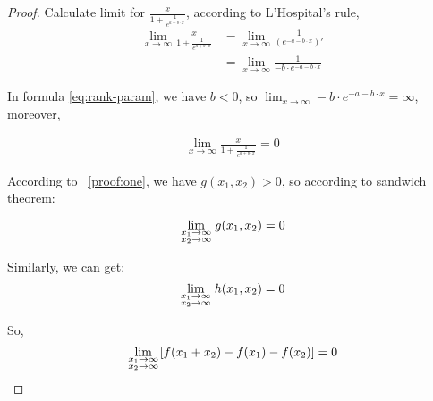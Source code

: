 \begin{proof}
Calculate limit for $\frac{x}{1+\frac{1}{e^{a+b\cdot x}}}$, according to L'Hospital's rule,
\[
\begin{aligned}
\lim_{x \to \infty}\frac{x}{1+\frac{1}{e^{a+b\cdot x}}}&=\lim_{x \to \infty}\frac{1}{(e^{-a-b\cdot x})'}\\
&=\lim_{x \to \infty}\frac{1}{-b\cdot e^{-a-b\cdot x}}
\end{aligned}
\]

In formula \ref{eq:rank-param}, we have $b<0$, so $\lim_{x \to \infty}-b\cdot e^{-a-b\cdot x}=\infty$, moreover,

\[
\begin{aligned}
\lim_{x \to \infty}\frac{x}{1+\frac{1}{e^{a+b\cdot x}}}=0
\end{aligned}
\]

According to ~\ref{proof:one}, we have $g(x_1,x_2)>0$, so according to sandwich theorem:

\[
\mathop {\lim }\limits_{\scriptstyle x_1 \to \infty  \hfill \atop  \scriptstyle x_2 \to \infty  \hfill}g(x_1,x_2)=0
\]

Similarly, we can get:
\[
\mathop {\lim }\limits_{\scriptstyle x_1 \to \infty  \hfill \atop  \scriptstyle x_2 \to \infty  \hfill}h(x_1,x_2)=0
\]

So,
\[
\mathop {\lim }\limits_{\scriptstyle x_1 \to \infty  \hfill \atop  \scriptstyle x_2 \to \infty  \hfill}[f(x_1+x_2)-f(x_1)-f(x_2)]=0
\]


\end{proof}